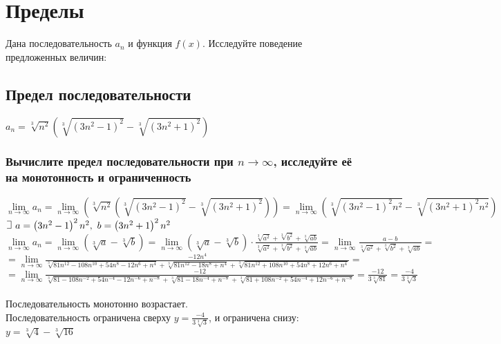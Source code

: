 \documentclass[a4paper,12pt]{article}
\def\letus{%
	\mathord{\setbox0=\hbox{$\exists$}%
		\hbox{\kern 0.125\wd0%
			\vbox to 1.15\ht0{%
				\hrule width 0.75\wd0%
				\vfill%
				\hrule width 0.75\wd0}%
			\vrule height 1.15\ht0%
			\kern 0.125\wd0}%
	}%
}
\begin{document}

\section{Пределы}

Дана последовательность $a_n$ и функция $f(x)$. Исследуйте поведение предложенных величин:

\subsection{Предел последовательности}

$a_n=\sqrt[3]{n^2}\left(\sqrt[3]{\left(3n^2-1\right)^2}-\sqrt[3]{\left(3n^2+1\right)^2}\right)$

\subsubsection{Вычислите предел последовательности при $n\rightarrow\infty$, исследуйте её на монотонность и ограниченность}

$\lim\limits_{n\rightarrow\infty}a_n=
	\lim\limits_{n\rightarrow\infty}\left(\sqrt[3]{n^2}\left(\sqrt[3]{\left(3n^2-1\right)^2}
	-\sqrt[3]{\left(3n^2+1\right)^2}\right)\right)=
	\lim\limits_{n\rightarrow\infty}\left(\sqrt[3]{\left(3n^2-1\right)^2n^2}
	-\sqrt[3]{\left(3n^2+1\right)^2n^2}\right)$\\
$\letus\ a=\left(3n^2-1\right)^2n^2,\ b=\left(3n^2+1\right)^2n^2$\\
$\lim\limits_{n\rightarrow\infty}a_n=
	\lim\limits_{n\rightarrow\infty}\left(\sqrt[3]{a}-\sqrt[3]{b}\right)=
	\lim\limits_{n\rightarrow\infty}\left(\sqrt[3]{a}-\sqrt[3]{b}\right)\cdot
	\frac{\sqrt[3]{a^2}+\sqrt[3]{b^2}+\sqrt[3]{ab}}{\sqrt[3]{a^2}+\sqrt[3]{b^2}+\sqrt[3]{ab}}
	=\lim\limits_{n\rightarrow\infty}\frac{a-b}{\sqrt[3]{a^2}+\sqrt[3]{b^2}+\sqrt[3]{ab}}=$\\
$=\lim\limits_{n\rightarrow\infty}\frac{-12n^4}{\sqrt[3]{81n^{12}-108n^{10}+54n^8-12n^6+n^4}
	+\sqrt[3]{81n^{12}-18n^8+n^4}+\sqrt[3]{81n^{12}+108n^{10}+54n^8+12n^6+n^4}}=$\\
$=\lim\limits_{n\rightarrow\infty}\frac{-12}{\sqrt[3]{81-108n^{-2}+54n^{-4}-12n^{-6}+n^{-8}}
	+\sqrt[3]{81-18n^{-4}+n^{-8}}+\sqrt[3]{81+108n^{-2}+54n^{-4}+12n^{-6}+n^{-8}}}=
	\frac{-12}{3\sqrt[3]{81}}=\frac{-4}{3\sqrt[3]{3}}$\\\\
Последовательность монотонно возрастает.\\
Последовательность ограничена сверху $y = \frac{-4}{3\sqrt[3]{3}}$, и ограничена снизу: $y = \sqrt[3]{4} - \sqrt[3]{16}$
\end{document}
